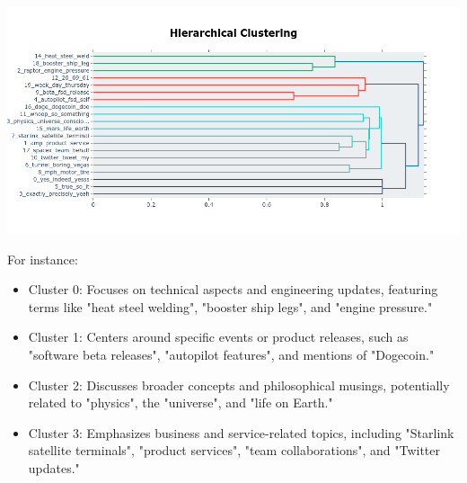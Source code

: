 \documentclass[12pt]{article}
\begin{document}
\begin{minipage}{0.48\textwidth}
    \centering
    \includegraphics[width=\linewidth]{clustering.png}
        \label{fig:clustering2}
    \end{minipage}\hfill


For instance:
\begin{itemize}
    \item Cluster 0: Focuses on technical aspects and engineering updates, featuring terms like "heat steel welding", "booster ship legs", and "engine pressure."
\item Cluster 1: Centers around specific events or product releases, such as "software beta releases", "autopilot features", and mentions of "Dogecoin."
\item Cluster 2: Discusses broader concepts and philosophical musings, potentially related to "physics", the "universe", and "life on Earth."
\item Cluster 3: Emphasizes business and service-related topics, including "Starlink satellite terminals", "product services", "team collaborations", and "Twitter updates."
\end{itemize}
\newpage
\end{document}
